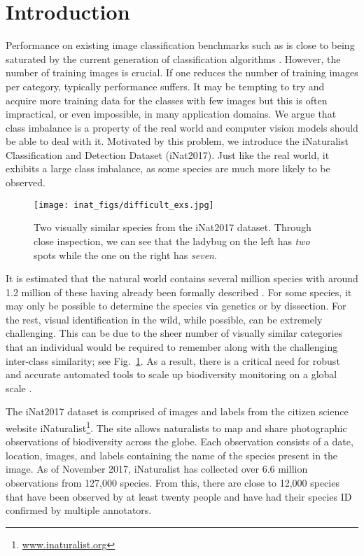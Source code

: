 \documentclass[10pt,twocolumn,letterpaper]{article}
\begin{document}
\section{Introduction}
Performance on existing image classification benchmarks such as \cite{russakovsky2015imagenet} is close to being saturated by the current generation of classification algorithms \cite{he2016deep, szegedy2016rethinking,szegedy2016inception,xie2016aggregated}. 
However, the number of training images is crucial. 
If one reduces the number of training images per category, typically performance suffers.
It may be tempting to try and acquire more training data for the classes with few images but this is often impractical, or even impossible, in many application domains. 
We argue that class imbalance is a property of the real world and computer vision models should be able to deal with it. 
Motivated by this problem, we introduce the iNaturalist Classification and Detection Dataset (iNat2017).
Just like the real world, it exhibits a large class imbalance, as some species are much more likely to be observed. 


\begin{figure}[t]
\centering
\texttt{[image: inat\_figs/difficult\_exs.jpg]}
\caption{Two visually similar species from the iNat2017 dataset. 
Through close inspection, we can see that the ladybug on the left has \emph{two} spots while the one on the right has \emph{seven}.} 
\label{fig:exemplar_res}
\vspace{-10pt}
\end{figure}

It is estimated that the natural world contains several million species with around 1.2 million of these having already been formally described \cite{mora2011many}. 
For some species, it may only be possible to determine the species via genetics or by dissection.
For the rest, visual identification in the wild, while possible, can be extremely challenging. 
This can be due to the sheer number of visually similar categories that an individual would be required to remember along with the challenging inter-class similarity; see Fig.~\ref{fig:exemplar_res}. 
As a result, there is a critical need for robust and accurate automated tools to scale up biodiversity monitoring on a global scale \cite{cardinale2012biodiversity}. 

The iNat2017 dataset is comprised of images and labels from the citizen science website iNaturalist\footnote{\url{www.inaturalist.org}}.
The site allows naturalists to map and share photographic observations of biodiversity across the globe. 
Each observation consists of a date, location, images, and labels containing the name of the species present in the image.
As of November 2017, iNaturalist has collected over 6.6 million observations from 127,000 species. 
From this, there are close to 12,000  species that have been observed by at least twenty people and have had their species ID confirmed by multiple annotators.
\end{document}
